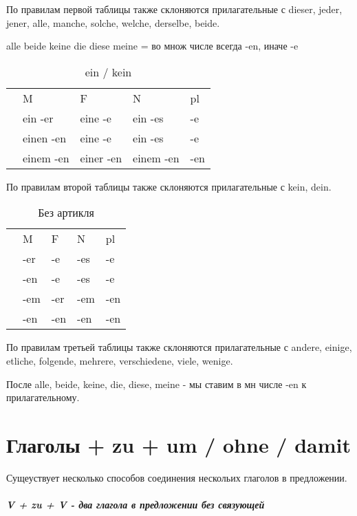 \documentclass[12pt,a4paper]{report}
\newcommand{\nom}{ {\color{black}{\textbf{N}}} }
\newcommand{\akk}{ {\color{red}{\textbf{A}}} }
\newcommand{\dat}{ {\color{blue}{\textbf{D}}} }
\newcommand{\gen}{ {\color{userdarkgreen}{\textbf{G}}} }
\begin{document}
По правилам первой таблицы также склоняются прилагательные с dieser, jeder, jener, alle, manche, solche, welche, derselbe, beide.

alle beide keine die diese meine = во множ числе всегда -en, иначе -e

\begin{longtable}{ c l l l l }
\caption{ein / kein} \label{tab:long} \\
		& M 			& F 		& N 		& pl 	\\
\nom 	& ein -er 		& eine -e	& ein -es	& -e	\\
\akk 	& einen -en 	& eine -e	& ein -es	& -e	\\
\dat 	& einem -en 	& einer -en	& einem -en	& -en	\\
\end{longtable}

По правилам второй таблицы также склоняются прилагательные с kein, dein.

\begin{longtable}{ c l l l l }
\caption{Без артикля} \label{tab:long} \\
		& M 	& F 	& N 	& pl 	\\
\nom 	& -er 	& -e	& -es	& -e	\\
\akk 	& -en 	& -e	& -es	& -e	\\
\dat 	& -em 	& -er	& -em	& -en	\\
\gen 	& -en 	& -en	& -en	& -en	\\
\end{longtable}

По правилам третьей таблицы также склоняются прилагательные с andere, einige, etliche, folgende, mehrere, verschiedene, viele, wenige.

После alle, beide, keine, die, diese, meine - мы ставим в мн числе -en к прилагательному.


\newpage

\newpage

\newpage

\newpage

\chapter{Глаголы + zu + um / ohne / damit}

Сущеуствует несколько способов соединения нескольих глаголов в предложении.

\paragraph{V + zu + V - два глагола в предложении без связующей}
\end{document}
